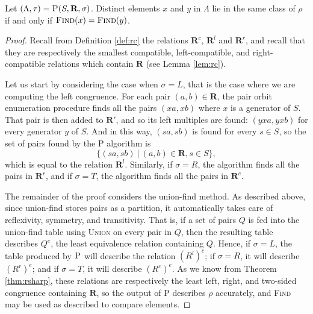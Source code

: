\begin{theorem}
  \label{thm:p}
  Let $(\Lambda, \tau) = \textsc{P}(S, \mathbf{R}, \sigma)$.  Distinct elements
  $x$ and $y$ in $\Lambda$ lie in the same class of $\rho$ if and only if
  $\textsc{Find}(x) = \textsc{Find}(y)$.
  \begin{proof}
    Recall from Definition \ref{def:rc} the relations $\mathbf{R}^c$,
    $\mathbf{R}^l$ and $\mathbf{R}^r$, and recall that they are respectively the
    smallest compatible, left-compatible, and right-compatible relations which
    contain $\mathbf{R}$ (see Lemma \ref{lem:rc}).

    Let us start by considering the case when $\sigma = L$, that is the case
    where we are computing the left congruence.  For each pair
    $(a,b) \in \mathbf{R}$, the pair orbit enumeration procedure finds all the
    pairs $(xa, xb)$ where $x$ is a generator of $S$.  That pair is then added
    to $\mathbf{R}'$, and so its left multiples are found: $(yxa, yxb)$ for
    every generator $y$ of $S$.  And in this way, $(sa, sb)$ is found for every
    $s \in S$, so the set of pairs found by the \textsc{P} algorithm is
    $$\{(sa, sb) ~|~ (a,b) \in \mathbf{R}, s \in S\},$$
    which is equal to the relation $\mathbf{R}^l$.
    Similarly, if $\sigma = R$, the algorithm finds all the pairs in
    $\mathbf{R}^r$, and if $\sigma = T$, the algorithm finds all the pairs in
    $\mathbf{R}^c$.

    The remainder of the proof considers the union-find method.  As described
    above, since union-find stores pairs as a partition, it automatically takes
    care of reflexivity, symmetry, and transitivity.  That is, if a set of pairs
    $Q$ is fed into the union-find table using \textsc{Union} on every pair in
    $Q$, then the resulting table describes $Q^e$, the least equivalence
    relation containing $Q$.  Hence, if $\sigma = L$, the table produced by
    $\textsc{P}$ will describe the relation $(R^l)^e$; if $\sigma = R$, it will
    describe $(R^r)^e$; and if $\sigma = T$, it will describe $(R^c)^e$.  As we
    know from Theorem \ref{thm:rsharp}, these relations are respectively the least
    left, right, and two-sided congruence containing $\mathbf{R}$, so the output
    of \textsc{P} describes $\rho$ accurately, and \textsc{Find} may be used as
    described to compare elements.
  \end{proof}
\end{theorem}

